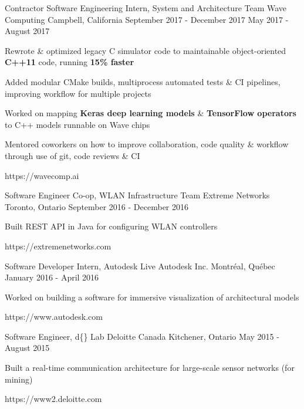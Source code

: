 \begin{cventries}
\cventrylink
{Contractor \newline {\vspace{-.75mm}}
Software Engineering Intern, System and Architecture Team}
{Wave Computing}
{Campbell, California}
{September 2017 - December 2017 \newline {\vspace{-1mm}}
May 2017 - August 2017}
{ %
\begin{cvitems}
\item {Rewrote \& optimized legacy C simulator code to maintainable object-oriented \textbf{C++11} code, running \textbf{15\% faster}}
\item {Added modular CMake builds, multiprocess automated tests \& CI pipelines, improving workflow for multiple projects}
\item {Worked on mapping \textbf{Keras deep learning models} \& \textbf{TensorFlow operators} to C++ models runnable on Wave chips}
\item {Mentored coworkers on how to improve collaboration, code quality \& workflow through use of git, code reviews \& CI}
\end{cvitems}
}
{https://wavecomp.ai}


\cventrylink
{Software Engineer Co-op, WLAN Infrastructure Team}
{Extreme Networks}
{Toronto, Ontario}
{September 2016 - December 2016}
{ %
Built REST API in Java for configuring WLAN controllers
\begin{cvitems}
\end{cvitems}
}
{https://extremenetworks.com}


\cventrylink
{Software Developer Intern, Autodesk Live}
{Autodesk Inc.}
{Montréal, Québec}
{January 2016 - April 2016}
{ %
Worked on building a software for immersive visualization of architectural models
\begin{cvitems}
\end{cvitems}
}
{https://www.autodesk.com}


\cventrylink
{Software Engineer, d\{\} Lab}
{Deloitte Canada} %
{Kitchener, Ontario} %
{May 2015 - August 2015} %
{
Built a real-time communication architecture for large-scale sensor networks (for mining)
\begin{cvitems}
\end{cvitems}
}
{https://www2.deloitte.com}


\end{cventries}
